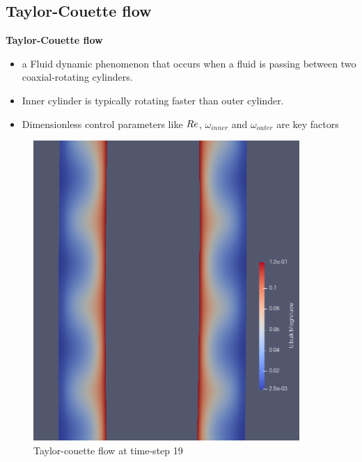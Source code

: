 \documentclass[aspectratio=169]{beamer}
\begin{document}
\subsection{Taylor-Couette flow}
\begin{frame}
  \begin{minipage}{0.45\textwidth}
    \large \color{TUCgreen}\textbf{Taylor-Couette flow}
    \begin{itemize}
      \item a Fluid dynamic phenomenon that occurs when a fluid is passing between two coaxial-rotating cylinders.
      \item Inner cylinder is typically rotating faster than outer cylinder.
      \item Dimensionless control parameters like \(\mathnormal{Re}\), $\omega_{inner}$ and $\omega_{outer}$  are key factors
    \end{itemize}
  \end{minipage}
  \begin{minipage}{0.45\textwidth}
    \vspace{-1.0 cm}
    \centering
    \begin{figure}[h]
      \includegraphics[width=0.9\textwidth]{Taylor_merve_vortex.png}
      \caption{\tiny{Taylor-couette flow at time-step 19}}
    \end{figure}
  \end{minipage}
\end{frame}
\end{document}
